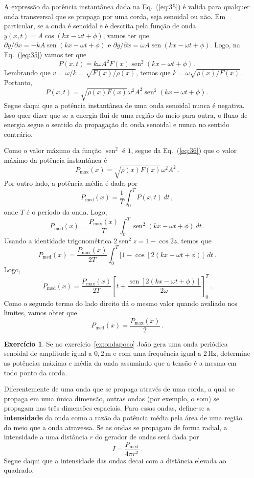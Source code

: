 \documentclass[twocolumn=on,fontsize=12pt,DIV=calc]{scrartcl}
\newcommand{\dsqr}[1]{\left[#1\right]}
\theoremstyle{definition}
\newtheorem{ex}{Exercício}[section]
\DeclareMathOperator{\sen}{sen}
\begin{document}
A expressão da potência instantânea dada na Eq.~(\ref{eq:35}) é valida
para qualquer onda transversal que se propaga por uma corda, seja
senoidal ou não. Em particular, se a onda é senoidal e é descrita pela
função de onda $y(x,t)=A\cos(kx-\omega t+\phi)$, vamos ter que
$\partial y/\partial x=-kA\sen(kx-\omega t+\phi)$ e
$\partial y/\partial x=\omega A\sen(kx-\omega t+\phi)$. Logo, na
Eq.~(\ref{eq:35}) vamos ter que
$$P(x,t)=k\omega A^2F(x)\sen^2(kx-\omega t+\phi)\,.$$
Lembrando que $v=\omega/k=\sqrt{F(x)/\rho(x)}$, temos que
$k=\omega\sqrt{\rho(x)/F(x)}$. Portanto,
\begin{equation}
  \label{eq:36}
  P(x,t)=\sqrt{\rho(x)F(x)}\omega^2A^2\sen^2(kx-\omega t+\phi)\,.
\end{equation}
Segue daqui que a potência instantânea de uma onda senoidal nunca é
negativa. Isso quer dizer que se a energia flui de uma região do meio
para outra, o fluxo de energia segue o sentido da propagação da onda
senoidal e nunca no sentido contrário.

Como o valor máximo da função $\sen^2$ é $1$, segue da
Eq.~(\ref{eq:36}) que o valor máximo da potência instantânea é
$$P_\mathrm{max}(x)=\sqrt{\rho(x)F(x)}\omega^2A^2\,.$$
Por outro lado, a potência média é dada por
$$P_\mathrm{med}(x)=\frac{1}{T}\int_0^TP(x,t)\,dt\,,$$
onde $T$ é o período da onda. Logo,
$$P_\mathrm{med}(x)=\frac{P_\mathrm{max}(x)}{T}\int_0^T\sen^2(kx-\omega t+\phi)\,dt\,.$$
Usando a identidade trigonométrica $2\sen^2z=1-\cos 2z$, temos que
$$P_\mathrm{med}(x)=\frac{P_\mathrm{max}(x)}{2T}\int_0^T[1-\cos[2(kx-\omega t+\phi)]\,dt\,.$$
Logo,
$$P_\mathrm{med}(x)=\frac{P_\mathrm{max}(x)}{2T}\dsqr{t+\frac{\sen[2(kx-\omega t+\phi)]}{2\omega}}_0^T\,.$$
Como o segundo termo do lado direito dá o mesmo valor quando avaliado
nos limites, vamos obter que
$$P_\mathrm{med}(x)=\frac{P_\mathrm{max}(x)}{2}\,.$$

\begin{ex}
  Se no exercício~\ref{ex:ondapoco} João gera uma onda periódica
  senoidal de amplitude igual a $0{,}2\,\mathrm{m}$ e com uma
  frequência igual a $2\,\mathrm{Hz}$, determine as potências máxima e
  média da onda assumindo que a tensão é a mesma em todo ponto da
  corda.
\end{ex}

Diferentemente de uma onda que se propaga através de uma corda, a qual
se propaga em uma única dimensão, outras ondas (por exemplo, o som) se
propagam nas três dimensões espaciais. Para essas ondas, define-se a
\textbf{intensidade} da onda como a razão da potência média pela área
de uma região do meio que a onda atravessa. Se as ondas se propagam de
forma radial, a intensidade a uma distância $r$ do gerador de ondas
será dada por
$$I=\frac{P_\mathrm{med}}{4\pi r^2}\,.$$
Segue daqui que a intensidade das ondas decai com a distância elevada
ao quadrado.
\end{document}
